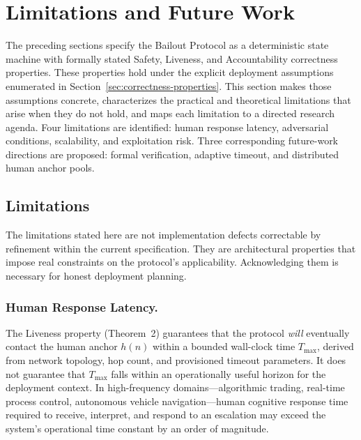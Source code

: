 \section{Limitations and Future Work}
\label{sec:limitations}

The preceding sections specify the Bailout Protocol as a deterministic state machine with formally stated Safety, Liveness, and Accountability correctness properties. These properties hold under the explicit deployment assumptions enumerated in Section~\ref{sec:correctness-properties}. This section makes those assumptions concrete, characterizes the practical and theoretical limitations that arise when they do not hold, and maps each limitation to a directed research agenda. Four limitations are identified: human response latency, adversarial conditions, scalability, and exploitation risk. Three corresponding future-work directions are proposed: formal verification, adaptive timeout, and distributed human anchor pools.

\subsection{Limitations}
\label{sec:limitations:subsection}

The limitations stated here are not implementation defects correctable by refinement within the current specification. They are architectural properties that impose real constraints on the protocol's applicability. Acknowledging them is necessary for honest deployment planning.

\subsubsection{Human Response Latency.}
\label{sec:latency-limitation}

The Liveness property (Theorem~2) guarantees that the protocol \emph{will} eventually contact the human anchor $h(n)$ within a bounded wall-clock time $T_{\max}$, derived from network topology, hop count, and provisioned timeout parameters. It does not guarantee that $T_{\max}$ falls within an operationally useful horizon for the deployment context. In high-frequency domains---algorithmic trading, real-time process control, autonomous vehicle navigation---human cognitive response time required to receive, interpret, and respond to an escalation may exceed the system's operational time constant by an order of magnitude.

